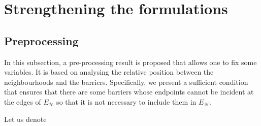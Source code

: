 \documentclass[a4paper,  review, authoryear, 1p., doubleblind]{elsarticle}
\newcommand{\EN}{{E^{}_{\mathcal N}}}
\newcommand{\determinant}[3]{\det({#1|#2#3})}
\begin{document}
	
	\section{Strengthening the formulations}\label{section:strengthening}
	
	\subsection{Preprocessing}\label{subsection:preprocessing}
	In this subsection, a pre-processing result is proposed that allows one to fix some variables. It is based on analysing the relative position between the neighbourhoods and the barriers.
	Specifically, we present a sufficient condition that ensures that there are some barriers whose endpoints cannot be incident at the edges of $\EN$ so that it is not necessary to include them in $\EN$. 
	
	Let us denote
	
\end{document}
